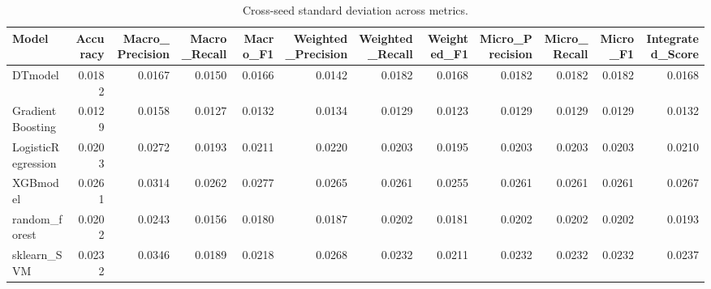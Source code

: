 \begin{table}[t]
\centering
\begin{tabular}{lrrrrrrrrrrr}
\toprule
Model & Accuracy & Macro_Precision & Macro_Recall & Macro_F1 & Weighted_Precision & Weighted_Recall & Weighted_F1 & Micro_Precision & Micro_Recall & Micro_F1 & Integrated_Score \\
\midrule
DTmodel & 0.0182 & 0.0167 & 0.0150 & 0.0166 & 0.0142 & 0.0182 & 0.0168 & 0.0182 & 0.0182 & 0.0182 & 0.0168 \\
GradientBoosting & 0.0129 & 0.0158 & 0.0127 & 0.0132 & 0.0134 & 0.0129 & 0.0123 & 0.0129 & 0.0129 & 0.0129 & 0.0132 \\
LogisticRegression & 0.0203 & 0.0272 & 0.0193 & 0.0211 & 0.0220 & 0.0203 & 0.0195 & 0.0203 & 0.0203 & 0.0203 & 0.0210 \\
XGBmodel & 0.0261 & 0.0314 & 0.0262 & 0.0277 & 0.0265 & 0.0261 & 0.0255 & 0.0261 & 0.0261 & 0.0261 & 0.0267 \\
random_forest & 0.0202 & 0.0243 & 0.0156 & 0.0180 & 0.0187 & 0.0202 & 0.0181 & 0.0202 & 0.0202 & 0.0202 & 0.0193 \\
sklearn_SVM & 0.0232 & 0.0346 & 0.0189 & 0.0218 & 0.0268 & 0.0232 & 0.0211 & 0.0232 & 0.0232 & 0.0232 & 0.0237 \\
\bottomrule
\end{tabular}
\caption{Cross-seed standard deviation across metrics.}
\label{tab:cross_seed_std}
\end{table}